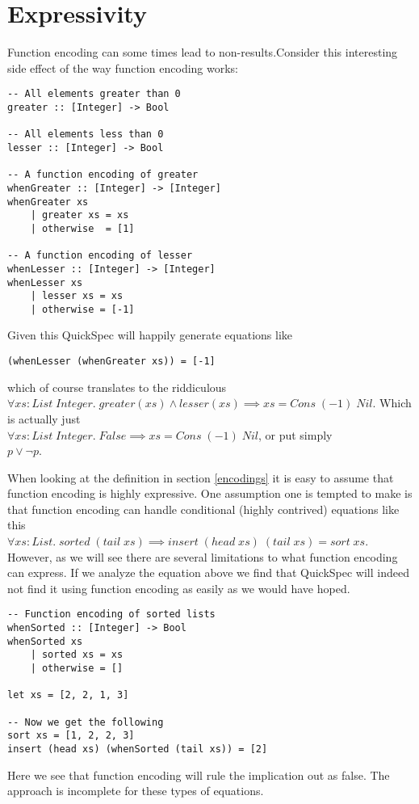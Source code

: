 \section{Expressivity}

Function encoding can some times lead to non-results.Consider this interesting side effect of the way function encoding
works:
\begin{verbatim}-- All elements greater than 0
greater :: [Integer] -> Bool

-- All elements less than 0 
lesser :: [Integer] -> Bool

-- A function encoding of greater
whenGreater :: [Integer] -> [Integer]
whenGreater xs
    | greater xs = xs
    | otherwise  = [1]

-- A function encoding of lesser 
whenLesser :: [Integer] -> [Integer]
whenLesser xs
    | lesser xs = xs
    | otherwise = [-1]\end{verbatim}
Given this QuickSpec will happily generate equations like
\begin{verbatim}(whenLesser (whenGreater xs)) = [-1]\end{verbatim}
which of course translates to the riddiculous\\
$\forall xs : List\; Integer.\; greater(xs)\wedge lesser(xs)\implies xs = Cons\; (-1)\; Nil$.
Which is actually just\\$\forall xs : List\; Integer.\; False\implies xs = Cons\; (-1)\; Nil$,
or put simply\\$p\vee \neg p$.

When looking at the definition in 
section \ref{encodings} it is easy to assume
that function encoding is highly expressive.
One assumption one is tempted to make is that
function encoding can handle conditional (highly contrived)
equations like this\\
$\forall xs : List.\;sorted\;(tail\; xs) \implies insert\;(head\;xs)\;(tail\;xs)=sort\;xs$.
However, as we will see there are several limitations to what function encoding can express.
If we analyze the equation above we find that QuickSpec will indeed not find it
using function encoding as easily as we would have hoped.
\begin{verbatim}-- Function encoding of sorted lists
whenSorted :: [Integer] -> Bool
whenSorted xs
    | sorted xs = xs
    | otherwise = []

let xs = [2, 2, 1, 3]

-- Now we get the following
sort xs = [1, 2, 2, 3]
insert (head xs) (whenSorted (tail xs)) = [2]\end{verbatim}
Here we see that function encoding will rule the implication out as false. The approach is
incomplete for these types of equations.

